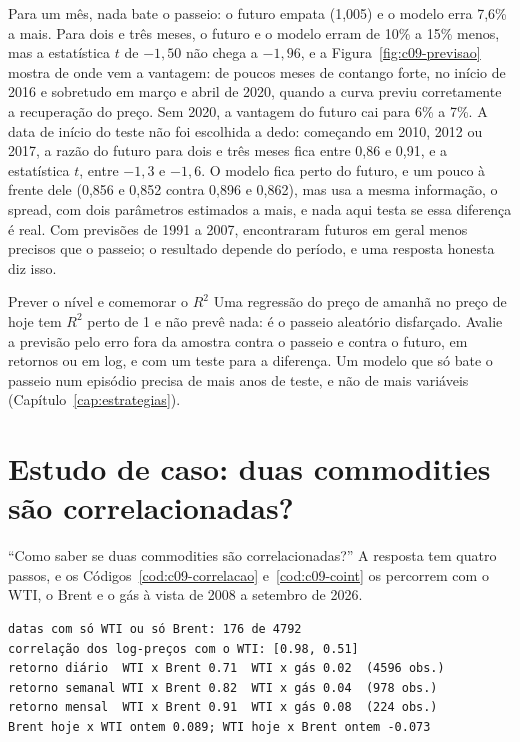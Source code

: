Para um mês, nada bate o passeio: o futuro empata (1,005) e o modelo erra 7,6\% a mais. Para dois e três meses, o futuro e o modelo erram de 10\% a 15\% menos, mas a estatística $t$ de $-1,50$ não chega a $-1,96$, e a Figura~\ref{fig:c09-previsao} mostra de onde vem a vantagem: de poucos meses de contango forte, no início de 2016 e sobretudo em março e abril de 2020, quando a curva previu corretamente a recuperação do preço. Sem 2020, a vantagem do futuro cai para 6\% a 7\%. A data de início do teste não foi escolhida a dedo: começando em 2010, 2012 ou 2017, a razão do futuro para dois e três meses fica entre 0,86 e 0,91, e a estatística $t$, entre $-1,3$ e $-1,6$. O modelo fica perto do futuro, e um pouco à frente dele (0,856 e 0,852 contra 0,896 e 0,862), mas usa a mesma informação, o spread, com dois parâmetros estimados a mais, e nada aqui testa se essa diferença é real. Com previsões de 1991 a 2007, \citet{alquist2010} encontraram futuros em geral menos precisos que o passeio; o resultado depende do período, e uma resposta honesta diz isso.

\begin{armadilha}{Prever o nível e comemorar o $R^2$}
Uma regressão do preço de amanhã no preço de hoje tem $R^2$ perto de 1 e não prevê nada: é o passeio aleatório disfarçado. Avalie a previsão pelo erro fora da amostra contra o passeio e contra o futuro, em retornos ou em log, e com um teste para a diferença. Um modelo que só bate o passeio num episódio precisa de mais anos de teste, e não de mais variáveis (Capítulo~\ref{cap:estrategias}).
\end{armadilha}

\section{Estudo de caso: duas commodities são correlacionadas?}
\label{sec:c09-correlacao}

``Como saber se duas commodities são correlacionadas?'' A resposta tem quatro passos, e os Códigos~\ref{cod:c09-correlacao} e~\ref{cod:c09-coint} os percorrem com o WTI, o Brent e o gás à vista de 2008 a setembro de 2026.


\begin{lstlisting}[style=saida]
datas com só WTI ou só Brent: 176 de 4792
correlação dos log-preços com o WTI: [0.98, 0.51]
retorno diário  WTI x Brent 0.71  WTI x gás 0.02  (4596 obs.)
retorno semanal WTI x Brent 0.82  WTI x gás 0.04  (978 obs.)
retorno mensal  WTI x Brent 0.91  WTI x gás 0.08  (224 obs.)
Brent hoje x WTI ontem 0.089; WTI hoje x Brent ontem -0.073
\end{lstlisting}


